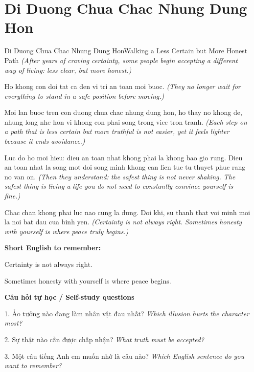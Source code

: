 \section{Di Duong Chua Chac Nhung Dung Hon}
\begin{truyen}{Di Duong Chua Chac Nhung Dung Hon}{Walking a Less Certain but More Honest Path}
\textit{(After years of craving certainty, some people begin accepting a different way of living: less clear, but more honest.)}

Ho khong con doi tat ca den vi tri an toan moi buoc.
\textit{(They no longer wait for everything to stand in a safe position before moving.)}

Moi lan buoc tren con duong chua chac nhung dung hon, ho thay no khong de, nhung long nhe hon vi khong con phai song trong viec tron tranh.
\textit{(Each step on a path that is less certain but more truthful is not easier, yet it feels lighter because it ends avoidance.)}

Luc do ho moi hieu: dieu an toan nhat khong phai la khong bao gio rung. Dieu an toan nhat la song mot doi song minh khong can lien tuc tu thuyet phuc rang no van on.
\textit{(Then they understand: the safest thing is not never shaking. The safest thing is living a life you do not need to constantly convince yourself is fine.)}

\end{truyen}

\begin{baihoc}
Chac chan khong phai luc nao cung la dung. Doi khi, su thanh that voi minh moi la noi bat dau cua binh yen.
\textit{(Certainty is not always right. Sometimes honesty with yourself is where peace truly begins.)}
\end{baihoc}

\begin{ghinhoanh}
\textbf{Short English to remember:}

Certainty is not always right.

Sometimes honesty with yourself is where peace begins.

\end{ghinhoanh}

\begin{tuhocnhanh}
\textbf{Câu hỏi tự học / Self-study questions}

1. Ảo tưởng nào đang làm nhân vật đau nhất? \textit{Which illusion hurts the character most?}

2. Sự thật nào cần được chấp nhận? \textit{What truth must be accepted?}

3. Một câu tiếng Anh em muốn nhớ là câu nào? \textit{Which English sentence do you want to remember?}
\end{tuhocnhanh}
